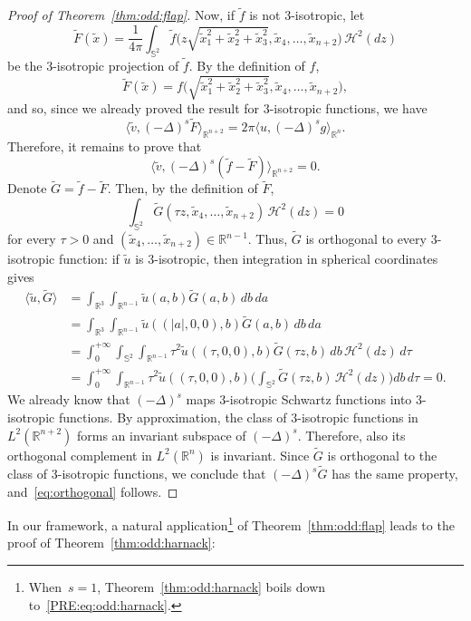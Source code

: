 \documentclass[a4paper,12pt,reqno]{amsart}
\numberwithin{equation}{section}
\theoremstyle{definition}
\theoremstyle{notation}
\newcommand{\R}{\mathds{R}}
\newcommand{\sph}{\mathds{S}}
\begin{document}
\begin{proof}[Proof of Theorem~\ref{thm:odd:flap}]
Now, if \(\tilde f\) is not \(3\)-isotropic, let
\[
 \tilde F(\tilde x) = \frac{1}{4 \pi} \int_{\sph^2} \tilde{f}\Big (z \sqrt{\tilde x_1^2 + \tilde x_2^2 + \tilde x_3^2}, \tilde x_4, \ldots, \tilde x_{n+2} \Big ) \, \mathcal H^2(dz)
\]
be the $3$-isotropic projection of $\tilde f$. By the definition of $f$,
\[
 \tilde F(\tilde x) = f\Big (\sqrt{\tilde x_1^2 + \tilde x_2^2 + \tilde x_3^2}, \tilde x_4, \ldots, \tilde x_{n+2} \Big ) ,
\]
and so, since we already proved the result for $3$-isotropic functions, we have
\[
 \langle \tilde v, (-\Delta)^s \tilde F \rangle_{\R^{n+2}} = 2 \pi \langle u, (-\Delta)^s g \rangle_{\R^n} .
\]
Therefore, it remains to prove that
\begin{equation}
\label{eq:orthogonal}
 \langle \tilde v, (-\Delta)^s (\tilde f - \tilde F) \rangle_{\R^{n+2}} = 0 .
\end{equation}
Denote $\tilde G = \tilde f - \tilde F$. Then, by the definition of $\tilde F$, 
\[
 \int_{\sph^2} \tilde G(\tau z, \tilde x_4, \ldots, \tilde x_{n+2}) \, \mathcal H^2(dz) = 0
\]
for every $\tau > 0$ and $(\tilde x_4, \ldots, \tilde x_{n+2}) \in \R^{n-1}$. Thus, $\tilde G$ is orthogonal to every $3$-isotropic function: if $\tilde u$ is $3$-isotropic, then integration in spherical coordinates gives
\begin{align*}
 \langle \tilde u, \tilde G\rangle & = \int_{\R^3} \int_{\R^{n-1}} \tilde u(a, b) \tilde G(a, b) \, db \, da \\
 & = \int_{\R^3} \int_{\R^{n-1}} \tilde u((|a|, 0, 0), b) \tilde G(a, b) \, db \, da \\
 & = \int_0^{+\infty} \int_{\sph^2} \int_{\R^{n-1}} \tau^2 \tilde u((\tau, 0, 0), b) \tilde G(\tau z, b) \, db \, \mathcal H^2(dz) \, d\tau \\
 & = \int_0^{+\infty} \int_{\R^{n-1}} \tau^2 \tilde u((\tau, 0, 0), b) \biggr(\int_{\sph^2} \tilde G(\tau z, b) \, \mathcal H^2(dz)\biggr) db \, d\tau = 0 .
\end{align*}
We already know that $(-\Delta)^s$ maps $3$-isotropic Schwartz functions into $3$-isotropic functions. By approximation, the class of $3$-isotropic functions in $L^2(\R^{n+2})$ forms an invariant subspace of $(-\Delta)^s$. Therefore, also its orthogonal complement in $L^2(\R^n)$ is invariant. Since $\tilde G$ is orthogonal to the class of $3$-isotropic functions, we conclude that $(-\Delta)^s \tilde G$ has the same property, and~\eqref{eq:orthogonal} follows.
\end{proof}


In our framework, a natural
application\footnote{When~$s=1$, Theorem~\ref{thm:odd:harnack}
boils down to~\eqref{PRE:eq:odd:harnack}.} of Theorem~\ref{thm:odd:flap} 
leads to the proof of Theorem~\ref{thm:odd:harnack}:
\end{document}
